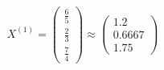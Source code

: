 \documentclass[preview]{standalone}
\begin{document}
\begin{align*}
X^{(1)} = \begin{pmatrix} \frac{6}{5} \\ \frac{2}{3} \\ \frac{7}{4} \end{pmatrix}\approx \begin{pmatrix} 1.2 \\ 0.6667 \\ 1.75 \end{pmatrix}
\end{align*}
\end{document}
